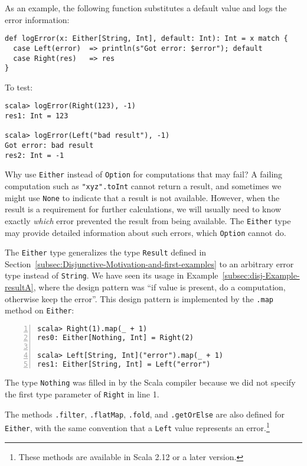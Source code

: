As an example, the following function substitutes a default value
and logs the error information:
\begin{lstlisting}
def logError(x: Either[String, Int], default: Int): Int = x match {
  case Left(error)  => println(s"Got error: $error"); default
  case Right(res)   => res
}
\end{lstlisting}
To test:
\begin{lstlisting}
scala> logError(Right(123), -1)
res1: Int = 123

scala> logError(Left("bad result"), -1)
Got error: bad result
res2: Int = -1
\end{lstlisting}

Why use \lstinline!Either! instead of \lstinline!Option! for computations
that may fail? A failing computation such as \lstinline!"xyz".toInt!
cannot return a result, and sometimes we might use \lstinline!None!
to indicate that a result is not available. However, when the result
is a requirement for further calculations, we will usually need to
know exactly \emph{which} error prevented the result from being available.
The \lstinline!Either! type may provide detailed information about
such errors, which \lstinline!Option! cannot do. 

The \lstinline!Either! type generalizes the type \lstinline!Result!
defined in Section~\ref{subsec:Disjunctive-Motivation-and-first-examples}
to an arbitrary error type instead of \lstinline!String!. We have
seen its usage in Example~\ref{subsec:disj-Example-resultA}, where
the design pattern was ``if value is present, do a computation, otherwise
keep the error''. This design pattern is implemented by the \lstinline!.map!
method on \lstinline!Either!:
\begin{lstlisting}[numbers=left,numberstyle={\small}]
scala> Right(1).map(_ + 1)
res0: Either[Nothing, Int] = Right(2)

scala> Left[String, Int]("error").map(_ + 1)
res1: Either[String, Int] = Left("error")
\end{lstlisting}
The type \lstinline!Nothing! was filled in by the Scala compiler
because we did not specify the first type parameter of \lstinline!Right!
in line 1.

The methods \lstinline!.filter!, \lstinline!.flatMap!, \lstinline!.fold!,
and \lstinline!.getOrElse! are also defined for \lstinline!Either!,
with the same convention that a \lstinline!Left! value represents
an error.\footnote{These methods are available in Scala 2.12 or a later version.}

